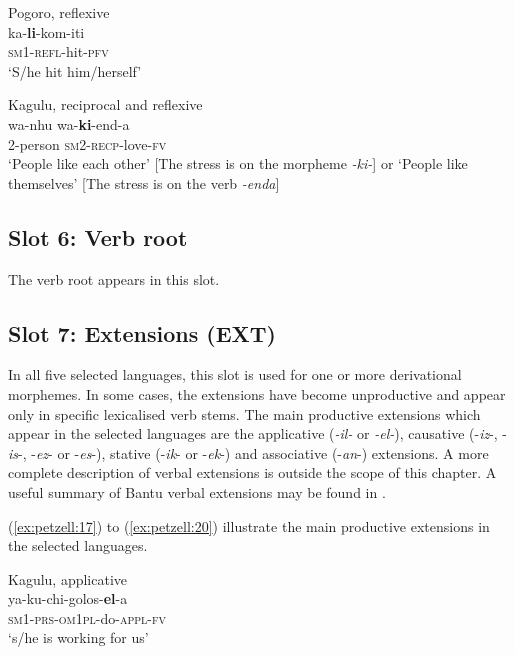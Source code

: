\documentclass[output=paper,
            colorlinks, citecolor=brown
            ,draftmode
		  ]{langscibook}
\begin{document}
\ex\label{ex:petzell:15}Pogoro, reflexive\\
\gll ka-\textbf{li}{}-kom-iti\\
\textsc{sm}1-\textsc{{refl}}{}-hit-\textsc{pfv}\\
\glt `S/he hit him/herself'


\ex\label{ex:petzell:16}Kagulu, reciprocal and reflexive\\
\gll wa-nhu       wa-\textbf{ki}{}-end-a \\
2-person     \textsc{sm}2-\textsc{{recp}}{}-love-\textsc{fv}\\
\glt `People like each other' [The stress is on the morpheme \textit{{}-ki-}] or
`People like themselves’ [The stress is on the verb \textit{{}-enda}]
\z

\subsection{Slot 6: Verb root}\label{sec:petzell:2.6}

The verb root appears in this slot.


\subsection{Slot 7: Extensions (EXT)}\label{sec:petzell:2.7}

In all five selected languages, this slot is used for one or more derivational morphemes. In some cases, the extensions have become unproductive and appear only in specific lexicalised verb stems. The main productive extensions which appear in the selected languages are the applicative (\textit{{}-il-} or \textit{{}-el-}), causative (\nobreakdash-\textit{iz}{}-, -\textit{is}{}-, -\textit{ez}{}- or -\textit{es}{}-), stative (-\textit{ik}{}- or -\textit{ek}{}-) and associative (-\textit{an}{}-) extensions. A more complete description of verbal extensions is outside the scope of this chapter. A useful summary of Bantu verbal extensions may be found in \citet{SchadebergBostoen2019}.



(\ref{ex:petzell:17}) to (\ref{ex:petzell:20}) illustrate the main productive extensions in the selected languages.


\ea\label{ex:petzell:17}Kagulu, applicative\\
\gll ya-ku-chi-golos-\textbf{el}{}-a\\
\textsc{sm}1-\textsc{prs}{}-\textsc{om}1\textsc{pl}{}-do-\textsc{{appl}}{}-\textsc{fv}\\
\glt `s/he is working for us'
\end{document}
